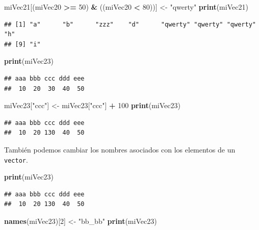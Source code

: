 \documentclass[]{book}
\newenvironment{Shaded}{\begin{snugshade}}{\end{snugshade}}
\newcommand{\KeywordTok}[1]{\textcolor[rgb]{0.13,0.29,0.53}{\textbf{#1}}}
\newcommand{\DecValTok}[1]{\textcolor[rgb]{0.00,0.00,0.81}{#1}}
\newcommand{\StringTok}[1]{\textcolor[rgb]{0.31,0.60,0.02}{#1}}
\newcommand{\OperatorTok}[1]{\textcolor[rgb]{0.81,0.36,0.00}{\textbf{#1}}}
\newcommand{\NormalTok}[1]{#1}
\begin{document}
\begin{Shaded}
\begin{Highlighting}[]
\NormalTok{miVec21[(miVec20 }\OperatorTok{>=}\StringTok{ }\DecValTok{50}\NormalTok{) }\OperatorTok{&}\StringTok{ }\NormalTok{((miVec20 }\OperatorTok{<}\StringTok{ }\DecValTok{80}\NormalTok{))] <-}\StringTok{ "qwerty"}
\KeywordTok{print}\NormalTok{(miVec21)}
\end{Highlighting}
\end{Shaded}

\begin{verbatim}
## [1] "a"      "b"      "zzz"    "d"      "qwerty" "qwerty" "qwerty" "h"     
## [9] "i"
\end{verbatim}

\begin{Shaded}
\begin{Highlighting}[]
\KeywordTok{print}\NormalTok{(miVec23)}
\end{Highlighting}
\end{Shaded}

\begin{verbatim}
## aaa bbb ccc ddd eee 
##  10  20  30  40  50
\end{verbatim}

\begin{Shaded}
\begin{Highlighting}[]
\NormalTok{miVec23[}\StringTok{"ccc"}\NormalTok{] <-}\StringTok{ }\NormalTok{miVec23[}\StringTok{"ccc"}\NormalTok{] }\OperatorTok{+}\StringTok{ }\DecValTok{100}
\KeywordTok{print}\NormalTok{(miVec23)}
\end{Highlighting}
\end{Shaded}

\begin{verbatim}
## aaa bbb ccc ddd eee 
##  10  20 130  40  50
\end{verbatim}

También podemos cambiar los nombres asociados con los elementos de un
\texttt{vector}.

\begin{Shaded}
\begin{Highlighting}[]
\KeywordTok{print}\NormalTok{(miVec23)}
\end{Highlighting}
\end{Shaded}

\begin{verbatim}
## aaa bbb ccc ddd eee 
##  10  20 130  40  50
\end{verbatim}

\begin{Shaded}
\begin{Highlighting}[]
\KeywordTok{names}\NormalTok{(miVec23)[}\DecValTok{2}\NormalTok{] <-}\StringTok{ "bb_bb"}
\KeywordTok{print}\NormalTok{(miVec23)}
\end{Highlighting}
\end{Shaded}
\end{document}
